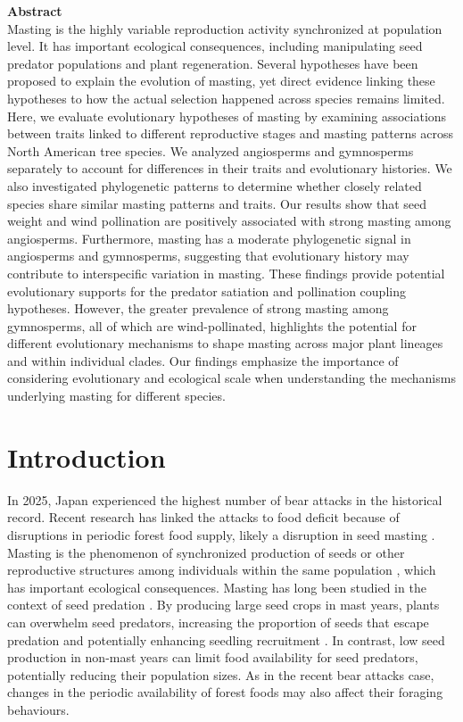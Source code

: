 \documentclass{article}
\begin{document}
\textbf{Abstract}\\
Masting is the highly variable reproduction activity synchronized at population level. It has important ecological consequences, including manipulating seed predator populations and plant regeneration. Several hypotheses have been proposed to explain the evolution of masting, yet direct evidence linking these hypotheses to how the actual selection happened across species remains limited. Here, we evaluate evolutionary hypotheses of masting by examining associations between traits linked to different reproductive stages and masting patterns across North American tree species. We analyzed angiosperms and gymnosperms separately to account for differences in their traits and evolutionary histories. We also investigated phylogenetic patterns to determine whether closely related species share similar masting patterns and traits. Our results show that seed weight and wind pollination are positively associated with strong masting among angiosperms. Furthermore, masting has a moderate phylogenetic signal in angiosperms and gymnosperms, suggesting that evolutionary history may contribute to interspecific variation in masting. These findings provide potential evolutionary supports for the predator satiation and pollination coupling hypotheses. However, the greater prevalence of strong masting among gymnosperms, all of which are wind-pollinated, highlights the potential for different evolutionary mechanisms to shape masting across major plant lineages and within individual clades. Our findings emphasize the importance of considering evolutionary and ecological scale when understanding the mechanisms underlying masting for different species.
\section{Introduction}
In 2025, Japan experienced the highest number of bear attacks in the historical record. Recent research has linked the attacks to food deficit because of disruptions in periodic forest food supply, likely a disruption in seed masting \citep{xiao2026compound}. Masting is the phenomenon of synchronized production of seeds or other reproductive structures among individuals within the same population \citep{kelly1994evolutionary,kelly2002mast, pearse2016mechanisms}, which has important ecological consequences. Masting has long been studied in the context of seed predation \citep{janzen1971seed, kelly1994evolutionary}. By producing large seed crops in mast years, plants can overwhelm seed predators, increasing the proportion of seeds that escape predation and potentially enhancing seedling recruitment \citep{kelly2002mast}. In contrast, low seed production in non-mast years can limit food availability for seed predators, potentially reducing their population sizes. As in the recent bear attacks case, changes in the periodic availability of forest foods may also affect their foraging behaviours. 
\end{document}
